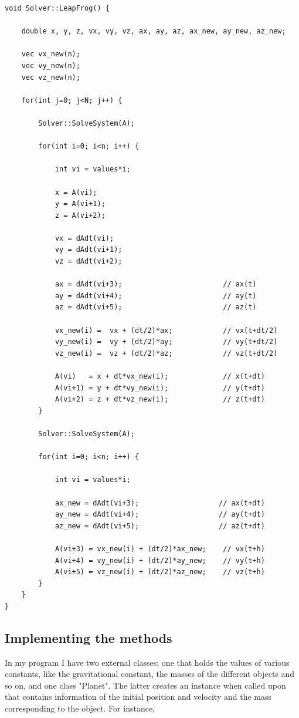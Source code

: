 \documentclass[a4paper,12pt, english]{article}
\begin{document}
 \begin{lstlisting}[title={Function Leap Frog}]
void Solver::LeapFrog() {

    double x, y, z, vx, vy, vz, ax, ay, az, ax_new, ay_new, az_new;

    vec vx_new(n);
    vec vy_new(n);
    vec vz_new(n);

    for(int j=0; j<N; j++) {

        Solver::SolveSystem(A);

        for(int i=0; i<n; i++) {

            int vi = values*i;

            x = A(vi);
            y = A(vi+1);
            z = A(vi+2);

            vx = dAdt(vi);
            vy = dAdt(vi+1);
            vz = dAdt(vi+2);

            ax = dAdt(vi+3);                        // ax(t)
            ay = dAdt(vi+4);                        // ay(t)
            az = dAdt(vi+5);                        // az(t)

            vx_new(i) =  vx + (dt/2)*ax;            // vx(t+dt/2)
            vy_new(i) =  vy + (dt/2)*ay;            // vy(t+dt/2)
            vz_new(i) =  vz + (dt/2)*az;            // vz(t+dt/2)

            A(vi)   = x + dt*vx_new(i);             // x(t+dt)
            A(vi+1) = y + dt*vy_new(i);             // y(t+dt)
            A(vi+2) = z + dt*vz_new(i);             // z(t+dt)
        }

        Solver::SolveSystem(A);

        for(int i=0; i<n; i++) {

            int vi = values*i;

            ax_new = dAdt(vi+3);                   // ax(t+dt)
            ay_new = dAdt(vi+4);                   // ay(t+dt)
            az_new = dAdt(vi+5);                   // az(t+dt)

            A(vi+3) = vx_new(i) + (dt/2)*ax_new;    // vx(t+h)
            A(vi+4) = vy_new(i) + (dt/2)*ay_new;    // vy(t+h)
            A(vi+5) = vz_new(i) + (dt/2)*az_new;    // vz(t+h)
        }
    }
}
\end{lstlisting}

\subsection*{Implementing the methods}
In my program I have two external classes; one that holds the values of various constants, like the gravitational constant, the masses of the different objects and so on, and one class "Planet". The latter creates an instance when called upon that contains information of the initial position and velocity and the mass corresponding to the object. For instance, 
\end{document}
